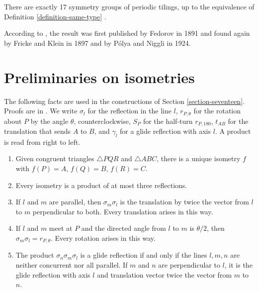\begin{theorem}
\label{theorem-seventeen}
There are exactly 17 symmetry groups of
periodic tilings, up to the equivalence of
Definition \ref{definition-same-type}
\cite{GrunbaumShephard1987}.
\end{theorem}

\noindent
According to \cite{Martin1982}, the result
was first published by Fedorov in 1891 and
found again by Fricke and Klein in 1897 and
by P\'olya and Niggli in 1924.

\section{Preliminaries on isometries}
\label{section-preliminaries}

\noindent
The following facts are used in the
constructions of Section
\ref{section-seventeen}. Proofs are in
\cite{Martin1982}. We write $\sigma_l$ for
the reflection in the line $l$,
$r_{P,\theta}$ for the rotation about $P$ by
the angle $\theta$, counterclockwise, $S_P$
for the half-turn $r_{P,180}$, $t_{AB}$ for
the translation that sends $A$ to $B$, and
$\gamma_l$ for a glide reflection with axis
$l$. A product is read from right to left.

\begin{proposition}
\label{proposition-isometries}
\begin{enumerate}
\item Given congruent triangles
$\triangle PQR$ and $\triangle ABC$, there is
a unique isometry $f$ with $f(P)=A$,
$f(Q)=B$, $f(R)=C$.
\item Every isometry is a product of at most
three reflections.
\item If $l$ and $m$ are parallel, then
$\sigma_m\sigma_l$ is the translation by
twice the vector from $l$ to $m$
perpendicular to both. Every translation
arises in this way.
\item If $l$ and $m$ meet at $P$ and the
directed angle from $l$ to $m$ is $\theta/2$,
then $\sigma_m\sigma_l=r_{P,\theta}$. Every
rotation arises in this way.
\item The product
$\sigma_n\sigma_m\sigma_l$ is a glide
reflection if and only if the lines $l,m,n$
are neither concurrent nor all parallel. If
$m$ and $n$ are perpendicular to $l$, it is
the glide reflection with axis $l$ and
translation vector twice the vector from $m$
to $n$.
\end{enumerate}
\end{proposition}

